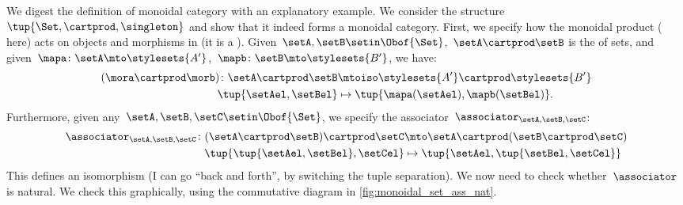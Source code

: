 
\begin{example}
    We digest the definition of monoidal category with an explanatory example.
    We consider the structure~$\tup{\Set,\cartprod,\singleton}$ and show that it indeed forms a monoidal category.
    First, we specify how the monoidal product ( here) acts on objects and morphisms in \Set (it is a ).
    Given~$\setA,\setB\setin \Obof{\Set}$,~$\setA\cartprod \setB$ is the  of sets, and given~$\mapa\colon \setA\mto \stylesets{A'}$,~$\mapb\colon \setB\mto \stylesets{B'}$, we have:
    \begin{equation}
        \label{eq:set_mon_prod_2}
        \begin{aligned}
            (\mora \cartprod \morb)
            \colon \setA\cartprod \setB & \mtoiso \stylesets{A'}\cartprod \stylesets{B'} \\
            \tup{\setAel,\setBel}       & \mapsto \tup{\mapa(\setAel),\mapb(\setBel)}.
        \end{aligned}
    \end{equation}
    Furthermore, given any~$\setA,\setB,\setC\setin \Obof{\Set}$, we specify the associator~$\associator_{\setA,\setB,\setC}$:
    \begin{equation}
        \label{eq:set_mon_prod_3}
        \begin{aligned}
            \associator_{\setA,\setB,\setC}\colon (\setA\cartprod \setB)\cartprod \setC & \mto \setA\cartprod (\setB\cartprod \setC) \\
            \tup{\tup{\setAel,\setBel},\setCel}                                         & \mapsto \tup{\setAel,\tup{\setBel,\setCel}}
        \end{aligned}
    \end{equation}
    This defines an isomorphism (I can go ``back and forth'', by switching the tuple separation).
    We now need to check whether~$\associator$ is natural.
    We check this graphically, using the commutative diagram in \cref{fig:monoidal_set_ass_nat}.


\end{example}
